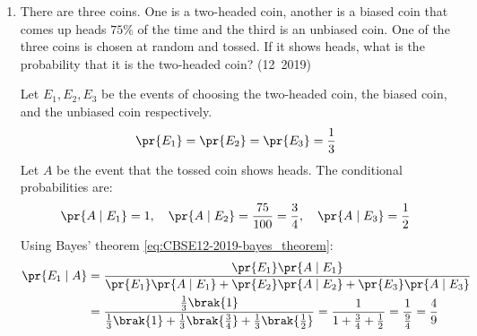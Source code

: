 \begin{enumerate}[label=\thesubsection.\arabic*, ref=\thesubsection.\theenumi]
\solution
Let $x$ and $y$ be the units of type A and type B goods produced.
From \eqref{eq:CBSE12-2019-lpp_obj} and \eqref{eq:CBSE12-2019-lpp_constraints}, the LPP formulation is:
\begin{align}
	\text{Maximize } & Z = 40x + 50y \\
	\text{subject to } & 3x + y \le 9 \\
	& x + 2y \le 8 \\
	& x \ge 0, \; y \ge 0
\end{align}
The feasible region is the polygon $OABC$ bounded by the extreme corner points:
\begin{align}
	O(0, 0), \quad A(3, 0), \quad B(2, 3), \quad C(0, 4)
\end{align}
Evaluating the objective function $Z$ at each corner point:
\begin{itemize}
	\item At $O(0, 0): Z = 0$
	\item At $A(3, 0): Z = 40\brak{3} + 50\brak{0} = 120$
	\item At $B(2, 3): Z = 40\brak{2} + 50\brak{3} = 80 + 150 = 230$
	\item At $C(0, 4): Z = 40\brak{0} + 50\brak{4} = 200$
\end{itemize}
By the Corner-Point Theorem, the maximum profit is Rs.~$230$, achieved by producing $2$ units of type A and $3$ units of type B.
The following code verifies the graphical optimization:
\begin{lstlisting}[frame=single, basicstyle=\ttfamily\small]
	codes/12/q36.py
\end{lstlisting}

\item There are three coins. One is a two-headed coin, another is a biased coin that comes up heads $75\%$ of the time and the third is an unbiased coin. One of the three coins is chosen at random and tossed. If it shows heads, what is the probability that it is the two-headed coin?
\hfill (12~2019)

\solution
Let $E_1, E_2, E_3$ be the events of choosing the two-headed coin, the biased coin, and the unbiased coin respectively.
\begin{align}
	\pr{E_1} = \pr{E_2} = \pr{E_3} = \frac{1}{3}
\end{align}
Let $A$ be the event that the tossed coin shows heads. The conditional probabilities are:
\begin{align}
	\pr{A \mid E_1} = 1, \quad \pr{A \mid E_2} = \frac{75}{100} = \frac{3}{4}, \quad \pr{A \mid E_3} = \frac{1}{2}
\end{align}
Using Bayes' theorem \eqref{eq:CBSE12-2019-bayes_theorem}:
\begin{align}
	\pr{E_1 \mid A} &= \frac{\pr{E_1}\pr{A \mid E_1}}{\pr{E_1}\pr{A \mid E_1} + \pr{E_2}\pr{A \mid E_2} + \pr{E_3}\pr{A \mid E_3}} \\
	&= \frac{\frac{1}{3}\brak{1}}{\frac{1}{3}\brak{1} + \frac{1}{3}\brak{\frac{3}{4}} + \frac{1}{3}\brak{\frac{1}{2}}} = \frac{1}{1 + \frac{3}{4} + \frac{1}{2}} = \frac{1}{\frac{9}{4}} = \frac{4}{9}
\end{align}



\end{enumerate}
